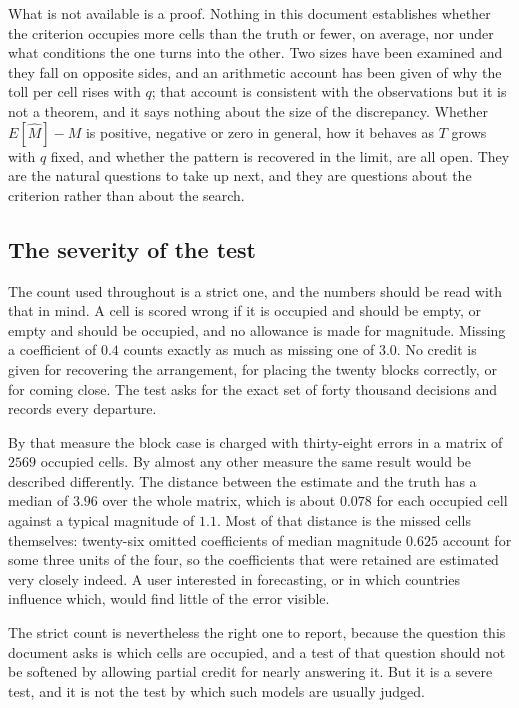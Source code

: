 What is not available is a proof. Nothing in this document establishes whether the
criterion occupies more cells than the truth or fewer, on average, nor under what
conditions the one turns into the other. Two sizes have been examined and they fall
on opposite sides, and an arithmetic account has been given of why the toll per cell
rises with $q$; that account is consistent with the observations but it is not a
theorem, and it says nothing about the size of the discrepancy. Whether
$E[\hat{M}] - M$ is positive, negative or zero in general, how it behaves as $T$
grows with $q$ fixed, and whether the pattern is recovered in the limit, are all
open. They are the natural questions to take up next, and they are questions about
the criterion rather than about the search.

\subsection{The severity of the test}

The count used throughout is a strict one, and the numbers should be read with that
in mind. A cell is scored wrong if it is occupied and should be empty, or empty and
should be occupied, and no allowance is made for magnitude. Missing a coefficient of
$0.4$ counts exactly as much as missing one of $3.0$. No credit is given for
recovering the arrangement, for placing the twenty blocks correctly, or for coming
close. The test asks for the exact set of forty thousand decisions and records every
departure.

By that measure the block case is charged with thirty-eight errors in a matrix of
$2569$ occupied cells. By almost any other measure the same result would be
described differently. The distance between the estimate and the truth has a median
of $3.96$ over the whole matrix, which is about $0.078$ for each occupied cell
against a typical magnitude of $1.1$. Most of that distance is the missed cells
themselves: twenty-six omitted coefficients of median magnitude $0.625$ account for
some three units of the four, so the coefficients that were retained are estimated
very closely indeed. A user interested in forecasting, or in which countries
influence which, would find little of the error visible.

The strict count is nevertheless the right one to report, because the question this
document asks is which cells are occupied, and a test of that question should not
be softened by allowing partial credit for nearly answering it. But it is a severe
test, and it is not the test by which such models are usually judged.


